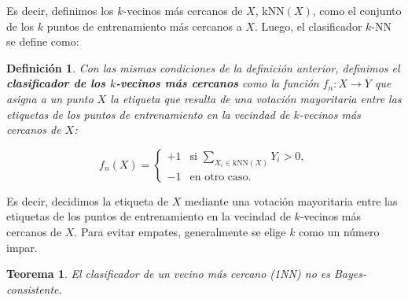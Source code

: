 \documentclass{article}
\newtheorem{thm}{Teorema}[subsection]
\newtheorem{dfn}{Definición}[subsection]
\begin{document}
Es decir, definimos los 
\(k\)-vecinos más cercanos de \(X\), \(\text{kNN}(X)\), como el conjunto de los \(k\) puntos de 
entrenamiento más cercanos a \(X\). Luego, el clasificador \(k\)-NN se define como:

\begin{dfn}
    Con las mismas condiciones de la definición anterior,
    definimos el \textbf{clasificador de los \(k\)-vecinos más cercanos} como la función \(f_n : X \to Y\) 
    que asigna a un punto \(X\) la etiqueta que resulta de una votación mayoritaria entre las etiquetas 
    de los puntos de entrenamiento en la vecindad de \(k\)-vecinos más cercanos de \(X\):


    \[
f_n(X) = 
\begin{cases} 
+1 & \text{si } \sum_{X_i \in \text{kNN}(X)} Y_i > 0, \\ 
-1 & \text{en otro caso}.
\end{cases}
\]
\end{dfn}


Es decir, decidimos la etiqueta de \(X\) mediante una votación mayoritaria entre las etiquetas de los 
puntos de entrenamiento en la vecindad de \(k\)-vecinos más cercanos de \(X\). Para evitar empates, 
generalmente se elige \(k\) como un número impar.


\begin{thm}
    El clasificador de un vecino más cercano (1NN) no es Bayes-consistente.
\end{thm}
\end{document}
